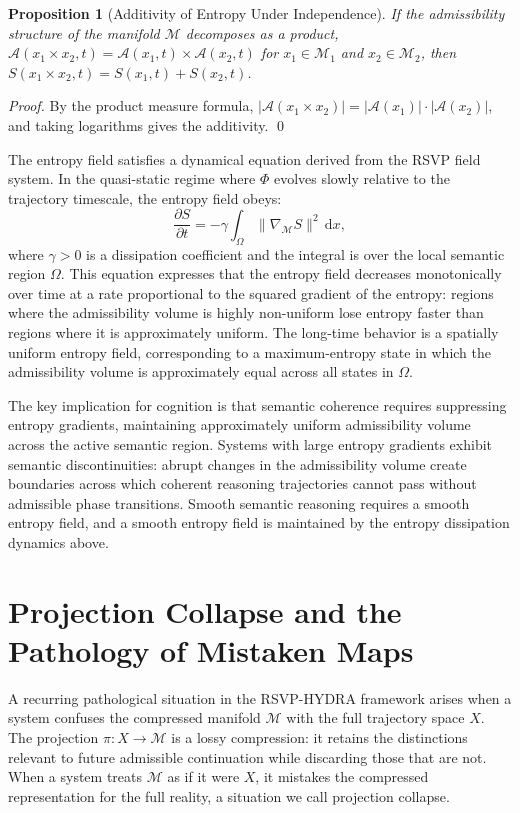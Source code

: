 \documentclass[12pt, a4paper, openany]{book}
\theoremstyle{plain}
\newtheorem{proposition}[theorem]{Proposition}
\theoremstyle{definition}
\theoremstyle{remark}
\newcommand{\Sfield}{S}
\newcommand{\Adm}{\mathcal{A}}
\begin{document}
\begin{proposition}[Additivity of Entropy Under Independence]
If the admissibility structure of the manifold $\mathcal{M}$ decomposes as a product, $\Adm(x_1 \times x_2, t) = \Adm(x_1, t) \times \Adm(x_2, t)$ for $x_1 \in \mathcal{M}_1$ and $x_2 \in \mathcal{M}_2$, then $\Sfield(x_1 \times x_2, t) = \Sfield(x_1, t) + \Sfield(x_2, t)$.
\end{proposition}

\begin{proof}
By the product measure formula, $|\Adm(x_1 \times x_2)| = |\Adm(x_1)| \cdot |\Adm(x_2)|$, and taking logarithms gives the additivity. \qed
\end{proof}

The entropy field satisfies a dynamical equation derived from the RSVP field system. In the quasi-static regime where $\Phi$ evolves slowly relative to the trajectory timescale, the entropy field obeys:
\[
\frac{\partial \Sfield}{\partial t} = -\gamma \int_\Omega \|\nabla_{\mathcal{M}} \Sfield\|^2 \, \mathrm{d}x,
\]
where $\gamma > 0$ is a dissipation coefficient and the integral is over the local semantic region $\Omega$. This equation expresses that the entropy field decreases monotonically over time at a rate proportional to the squared gradient of the entropy: regions where the admissibility volume is highly non-uniform lose entropy faster than regions where it is approximately uniform. The long-time behavior is a spatially uniform entropy field, corresponding to a maximum-entropy state in which the admissibility volume is approximately equal across all states in $\Omega$.

The key implication for cognition is that semantic coherence requires suppressing entropy gradients, maintaining approximately uniform admissibility volume across the active semantic region. Systems with large entropy gradients exhibit semantic discontinuities: abrupt changes in the admissibility volume create boundaries across which coherent reasoning trajectories cannot pass without admissible phase transitions. Smooth semantic reasoning requires a smooth entropy field, and a smooth entropy field is maintained by the entropy dissipation dynamics above.

\section{Projection Collapse and the Pathology of Mistaken Maps}

A recurring pathological situation in the RSVP-HYDRA framework arises when a system confuses the compressed manifold $\mathcal{M}$ with the full trajectory space $X$. The projection $\pi: X \to \mathcal{M}$ is a lossy compression: it retains the distinctions relevant to future admissible continuation while discarding those that are not. When a system treats $\mathcal{M}$ as if it were $X$, it mistakes the compressed representation for the full reality, a situation we call projection collapse.
\end{document}

